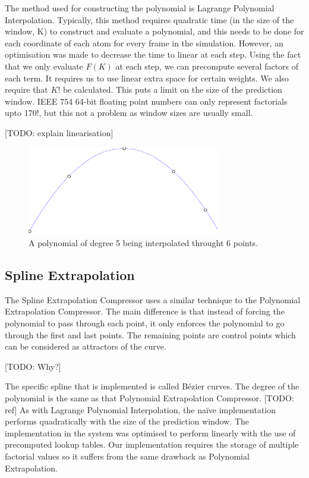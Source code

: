 \documentclass[a4paper,11pt]{report}
\begin{document}
The method used for constructing the polynomial is Lagrange Polynomial Interpolation. Typically, this method requires quadratic time (in the size of the window, K) to construct and evaluate a polynomial, and this needs to be done for each coordinate of each atom for every frame in the simulation. However, an optimisation was made to decrease the time to linear at each step. Using the fact that we only evaluate $F(K)$ at each step, we can precompute several factors of each term. It requires us to use linear extra space for certain weights. We also require that $K!$ be calculated. This puts a limit on the size of the prediction window. IEEE 754 64-bit floating point numbers can only represent factorials upto 170!, but this not a problem as window sizes are usually small.

[TODO: explain linearisation]

\begin{figure}
 \center
 \includegraphics[width=0.75\textwidth]{resources/PolynomialInterpolation.png}
\caption{A polynomial of degree 5 being interpolated throught 6 points. }
\label{PolyDescrip}
\end{figure}

\subsection{Spline Extrapolation}

The Spline Extrapolation Compressor uses a similar technique to the Polynomial Extrapolation Compressor. The main difference is that instead of forcing the polynomial to pass through each point, it only enforces the polynomial to go through the first and last points. The remaining points are control points which can be considered as attractors of the curve.

[TODO: Why?]

The specific spline that is implemented is called B\'ezier curves. The degree of the polynomial is the same as that Polynomial Extrapolation Compressor. [TODO: ref] As with Lagrange Polynomial Interpolation, the na\"ive implementation performs quadratically with the size of the prediction window. The implementation in the system was optimised to perform linearly with the use of precomputed lookup tables. Our implementation requires the storage of multiple factorial values so it suffers from the same drawback as Polynomial Extrapolation.
\end{document}

